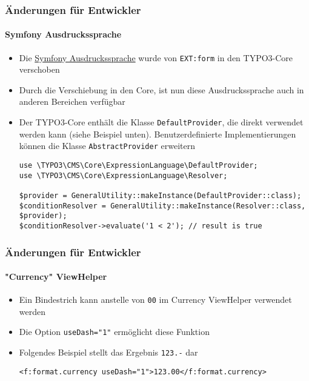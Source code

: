 \begin{frame}[fragile]
	\frametitle{Änderungen für Entwickler}
	\framesubtitle{Symfony Ausdruckssprache}

	\lstset{basicstyle=\tiny\ttfamily}

	\begin{itemize}
		\item Die \href{https://symfony.com/doc/current/components/expression_language/syntax.html}{Symfony Ausdruckssprache}
			 wurde von \texttt{EXT:form} in den TYPO3-Core verschoben
		\item Durch die Verschiebung in den Core, ist nun diese Ausdruckssprache 
			auch in anderen Bereichen verfügbar
		\item Der TYPO3-Core enthält die Klasse \texttt{DefaultProvider}, die direkt verwendet werden
			kann (siehe Beispiel unten). Benutzerdefinierte Implementierungen können
			die Klasse \texttt{AbstractProvider} erweitern

			\begin{lstlisting}
use \TYPO3\CMS\Core\ExpressionLanguage\DefaultProvider;
use \TYPO3\CMS\Core\ExpressionLanguage\Resolver;

$provider = GeneralUtility::makeInstance(DefaultProvider::class);
$conditionResolver = GeneralUtility::makeInstance(Resolver::class, $provider);
$conditionResolver->evaluate('1 < 2'); // result is true
			\end{lstlisting}

	\end{itemize}

\end{frame}


\begin{frame}[fragile]
	\frametitle{Änderungen für Entwickler}
	\framesubtitle{"Currency" ViewHelper}


	\begin{itemize}
		\item Ein Bindestrich kann anstelle von \texttt{00} im 
			Currency ViewHelper verwendet werden
		\item Die Option \texttt{useDash="1"} ermöglicht diese Funktion
		\item Folgendes Beispiel stellt das Ergebnis \texttt{123.-} dar

			\begin{lstlisting}
<f:format.currency useDash="1">123.00</f:format.currency>
			\end{lstlisting}

	\end{itemize}

\end{frame}

